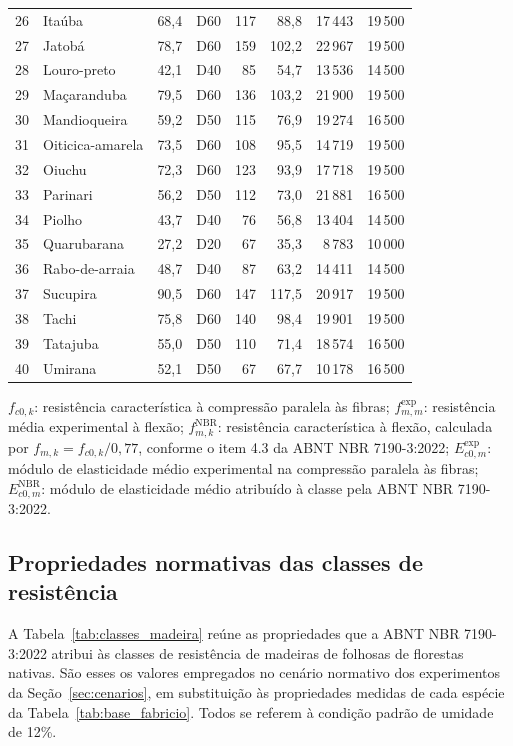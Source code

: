 \begin{appendices}
\begin{longtable}{@{}r p{} r c r r r r@{}}
26 & Itaúba & 68,4 & D60 & 117 & 88,8 & 17\,443 & 19\,500 \\
27 & Jatobá & 78,7 & D60 & 159 & 102,2 & 22\,967 & 19\,500 \\
28 & Louro-preto & 42,1 & D40 & 85 & 54,7 & 13\,536 & 14\,500 \\
29 & Maçaranduba & 79,5 & D60 & 136 & 103,2 & 21\,900 & 19\,500 \\
30 & Mandioqueira & 59,2 & D50 & 115 & 76,9 & 19\,274 & 16\,500 \\
31 & Oiticica-amarela & 73,5 & D60 & 108 & 95,5 & 14\,719 & 19\,500 \\
32 & Oiuchu & 72,3 & D60 & 123 & 93,9 & 17\,718 & 19\,500 \\
33 & Parinari & 56,2 & D50 & 112 & 73,0 & 21\,881 & 16\,500 \\
34 & Piolho & 43,7 & D40 & 76 & 56,8 & 13\,404 & 14\,500 \\
35 & Quarubarana & 27,2 & D20 & 67 & 35,3 & 8\,783 & 10\,000 \\
36 & Rabo-de-arraia & 48,7 & D40 & 87 & 63,2 & 14\,411 & 14\,500 \\
37 & Sucupira & 90,5 & D60 & 147 & 117,5 & 20\,917 & 19\,500 \\
38 & Tachi & 75,8 & D60 & 140 & 98,4 & 19\,901 & 19\,500 \\
39 & Tatajuba & 55,0 & D50 & 110 & 71,4 & 18\,574 & 16\,500 \\
40 & Umirana & 52,1 & D50 & 67 & 67,7 & 10\,178 & 16\,500 \\
\end{longtable}
\endgroup

\noindent\footnotesize $f_{c0,k}$: resistência característica à compressão paralela às fibras; $f_{m,m}^{\mathrm{exp}}$: resistência média experimental à flexão; $f_{m,k}^{\mathrm{NBR}}$: resistência característica à flexão, calculada por $f_{m,k}=f_{c0,k}/0{,}77$, conforme o item 4.3 da ABNT NBR 7190-3:2022; $E_{c0,m}^{\mathrm{exp}}$: módulo de elasticidade médio experimental na compressão paralela às fibras; $E_{c0,m}^{\mathrm{NBR}}$: módulo de elasticidade médio atribuído à classe pela ABNT NBR 7190-3:2022.\normalsize

\subsection*{Propriedades normativas das classes de resistência}\label{ap:classes}

A Tabela~\ref{tab:classes_madeira} reúne as propriedades que a ABNT NBR 7190-3:2022 atribui às classes de resistência de madeiras de folhosas de florestas nativas. São esses os valores empregados no cenário normativo dos experimentos da Seção~\ref{sec:cenarios}, em substituição às propriedades medidas de cada espécie da Tabela~\ref{tab:base_fabricio}. Todos se referem à condição padrão de umidade de 12\%.


\end{appendices}
